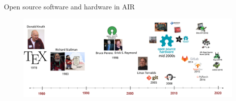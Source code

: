 {
\begin{frame}{Open source software and hardware in AIR}

      \begin{figure}
        \centering
        \includegraphics[width=1.0\textwidth]{./figures/timeline-osh/versions/drawing-v00.png}
      \end{figure}
\end{frame}
}

